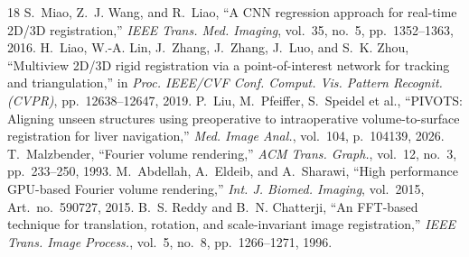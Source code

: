 \documentclass[journal]{IEEEtran}
\begin{document}
\begin{thebibliography}{18}
S.~Miao, Z.~J. Wang, and R.~Liao, ``A CNN regression approach for real-time 2D/3D registration,'' \emph{IEEE Trans. Med. Imaging}, vol.~35, no.~5, pp.~1352--1363, 2016.
H.~Liao, W.-A. Lin, J.~Zhang, J.~Zhang, J.~Luo, and S.~K. Zhou, ``Multiview 2D/3D rigid registration via a point-of-interest network for tracking and triangulation,'' in \emph{Proc. IEEE/CVF Conf. Comput. Vis. Pattern Recognit. (CVPR)}, pp.~12638--12647, 2019.
P.~Liu, M.~Pfeiffer, S.~Speidel et al., ``PIVOTS: Aligning unseen structures using preoperative to intraoperative volume-to-surface registration for liver navigation,'' \emph{Med. Image Anal.}, vol.~104, p.~104139, 2026.
T.~Malzbender, ``Fourier volume rendering,'' \emph{ACM Trans. Graph.}, vol.~12, no.~3, pp.~233--250, 1993.
M.~Abdellah, A.~Eldeib, and A.~Sharawi, ``High performance GPU-based Fourier volume rendering,'' \emph{Int. J. Biomed. Imaging}, vol.~2015, Art.~no.~590727, 2015.
B.~S. Reddy and B.~N. Chatterji, ``An FFT-based technique for translation, rotation, and scale-invariant image registration,'' \emph{IEEE Trans. Image Process.}, vol.~5, no.~8, pp.~1266--1271, 1996.
\end{thebibliography}
\end{document}
